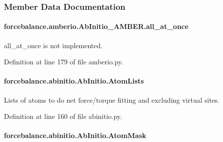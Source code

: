 \subsubsection{Member Data Documentation}
\hypertarget{classforcebalance_1_1amberio_1_1AbInitio__AMBER_a39462b1942be0f7fb6202862ad1afa9c}{
\paragraph[{all\-\_\-at\-\_\-once}]{\setlength{\rightskip}{0pt plus 5cm}forcebalance.\-amberio.\-Ab\-Initio\-\_\-\-A\-M\-B\-E\-R.\-all\-\_\-at\-\_\-once}}\label{classforcebalance_1_1amberio_1_1AbInitio__AMBER_a39462b1942be0f7fb6202862ad1afa9c}


all\-\_\-at\-\_\-once is not implemented. 



Definition at line 179 of file amberio.\-py.

\hypertarget{classforcebalance_1_1abinitio_1_1AbInitio_a7e62a74e820ac0c5dd67f49155b95c41}{
\paragraph[{Atom\-Lists}]{\setlength{\rightskip}{0pt plus 5cm}forcebalance.\-abinitio.\-Ab\-Initio.\-Atom\-Lists\hspace{0.3cm}{\ttfamily [inherited]}}}\label{classforcebalance_1_1abinitio_1_1AbInitio_a7e62a74e820ac0c5dd67f49155b95c41}


Lists of atoms to do net force/torque fitting and excluding virtual sites. 



Definition at line 160 of file abinitio.\-py.

\hypertarget{classforcebalance_1_1abinitio_1_1AbInitio_a09c8bbc29d2de7dbc471d56cbc574d5d}{
\paragraph[{Atom\-Mask}]{\setlength{\rightskip}{0pt plus 5cm}forcebalance.\-abinitio.\-Ab\-Initio.\-Atom\-Mask\hspace{0.3cm}{\ttfamily [inherited]}}}\label{classforcebalance_1_1abinitio_1_1AbInitio_a09c8bbc29d2de7dbc471d56cbc574d5d}


